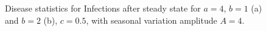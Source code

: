 \begin{figure}[H]
    \centering
    \caption{Disease statistics for Infections after steady state for $a=4$, $b=1$ (a) and $b=2$ (b), $c=0.5$, with seasonal variation amplitude $A = 4$.}
    \label{fig:seasonal_SS}
\end{figure}



